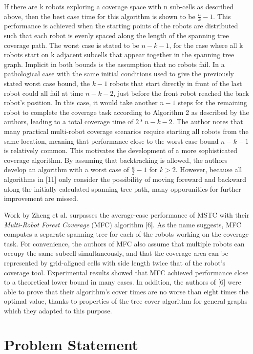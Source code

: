 \documentclass[letterpaper, 12pt, leqno]{report}
\begin{document}
If there are k robots exploring a coverage space with n sub-cells as described above, then the best case time for this algorithm is shown to be $ \frac{n}{k} - 1 $. This performance is achieved when the starting points of the robots are distributed such that each robot is evenly spaced along the length of the spanning tree coverage path. The worst case is stated to be $ n - k - 1$, for the case where all k robots start on k adjacent subcells that appear together in the spanning tree graph. Implicit in both bounds is the assumption that no robots fail. In a pathological case with the same initial conditions used to give the previously stated worst case bound, the $ k - 1$ robots that start directly in front of the last robot could all fail at time $ n - k - 2$, just before the front robot reached the back robot's position. In this case, it would take another $n - 1$  steps for the remaining robot to complete the coverage task according to Algorithm 2 as described by the authors, leading to a total coverage time of $ 2 * n - k - 2 $. The author notes that many practical multi-robot coverage scenarios require starting all robots from the same location, meaning that performance close to the worst case bound $ n - k - 1 $ is relatively common. This motivates the development of a more sophisticated coverage algorithm. By assuming that backtracking is allowed, the authors develop an algorithm with a worst case of $ \frac{n}{2} - 1 $ for $ k > 2 $. However, because all algorithms in [11] only consider the possibility of moving foreward and backward along the initially calculated spanning tree path, many opporunities for further improvement are missed.

Work by Zheng et al. surpasses the average-case performance of MSTC with their \textit{Multi-Robot Forest Coverage} (MFC) algorithm [6]. As the name suggests, MFC computes a separate spanning tree for each of the robots working on the coverage task. For convenience, the authors of MFC also assume that multiple robots can occupy the same subcell simultaneously, and that the coverage area can be represented by grid-aligned cells with side length twice that of the robot's coverage tool. Experimental results showed that MFC achieved performance close to a theoretical lower bound in many cases. In addition, the authors of [6] were able to prove that their algorithm's cover times are no worse than eight times the optimal value, thanks to properties of the tree cover algorithm for general graphs which they adapted to this purpose.

\section{Problem Statement}
\end{document}
